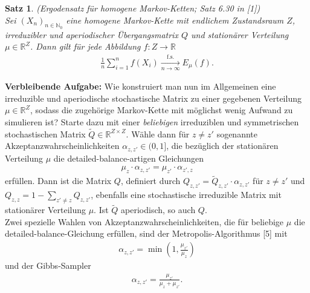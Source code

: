 \documentclass[twoside]{article}
\newcounter{lecnum}
\newtheorem{theorem}{Satz}[lecnum]
\theoremstyle{definition}
\begin{document}
\begin{theorem}(Ergodensatz für homogene Markov-Ketten; Satz 6.30 in [1])\\
Sei $(X_n)_{n \in \mathbb{N}_0}$ eine homogene Markov-Kette mit endlichem Zustandsraum $Z$,  irreduzibler und aperiodischer Übergangsmatrix $Q$ und stationärer Verteilung $\mu \in \mathbb{R}^Z$. Dann gilt für jede Abbildung $f:Z\to \mathbb{R}$
\begin{align}
\frac{1}{n} \sum_{i=1}^n f(X_i) \xrightarrow[n  \to \infty]{\text{f.s.}} E_\mu(f).
\end{align}
\end{theorem}

\textbf{Verbleibende Aufgabe:} Wie konstruiert man nun im Allgemeinen eine irreduzible und aperiodische stochastische Matrix zu einer gegebenen Verteilung $\mu \in \mathbb{R}^Z$, sodass die zugehörige Markov-Kette mit möglichst wenig Aufwand zu simulieren ist? Starte dazu mit einer \textit{beliebigen} irreduziblen und symmetrischen stochastischen Matrix $\tilde{Q} \in \mathbb{R}^{Z \times Z}$. Wähle dann für $z \neq z'$ sogenannte Akzeptanzwahrscheinlichkeiten $\alpha_{z,z'} \in (0,1]$, die bezüglich der stationären Verteilung $\mu$ die detailed-balance-artigen Gleichungen
\begin{align}
\mu_z \cdot \alpha_{z,z'} = \mu_{z'} \cdot \alpha_{z',z}
\end{align}
erfüllen. Dann ist die Matrix $Q$, definiert durch $Q_{z,z'}=\tilde{Q}_{z,z'} \cdot \alpha_{z,z'}$ für $z \neq z'$ und $Q_{z,z} = 1 - \sum_{z' \neq z} Q_{z,z'}$, ebenfalls eine stochastische irreduzible Matrix mit stationärer Verteilung $\mu$. Ist $\tilde{Q}$ aperiodisch, so auch $Q$.\\

Zwei spezielle Wahlen von Akzeptanzwahrscheinlichkeiten, die für beliebige $\mu$ die detailed-balance-Gleichung erfüllen, sind der Metropolis-Algorithmus [5] mit
\begin{align}
\alpha_{z,z'} = \min\left(1,\frac{\mu_{z'}}{\mu_z}\right)
\end{align}
und der Gibbs-Sampler
\begin{align}
\alpha_{z,z'} = \frac{\mu_{z'}}{\mu_z+\mu_{z'}}.
\end{align}
\end{document}
